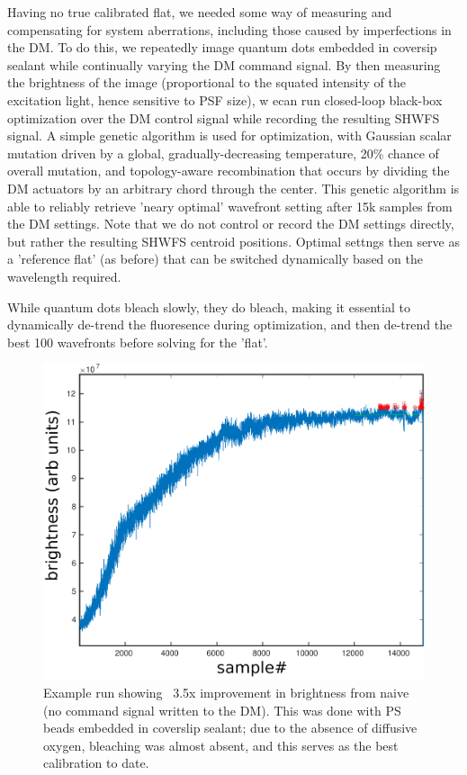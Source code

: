 \documentclass[a4paper,10pt]{article}
\begin{document}
Having no true calibrated flat, we needed some way of measuring and compensating for system aberrations, including those caused by imperfections in the DM.  To do this, we repeatedly image quantum dots embedded in coversip sealant while continually varying the DM command signal.  By then measuring the brightness of the image (proportional to the squated intensity of the excitation light, hence sensitive to PSF size), w ecan run closed-loop black-box optimization over the DM control signal while recording the resulting SHWFS signal.  A simple genetic algorithm is used for optimization, with Gaussian scalar mutation driven by a global, gradually-decreasing temperature, 20\% chance of overall mutation, and topology-aware recombination that occurs by dividing the DM actuators by an arbitrary chord through the center.  This genetic algorithm is able to reliably retrieve 'neary optimal' wavefront setting after 15k samples from the DM settings.  Note that we do not control or record the DM settings directly, but rather the resulting SHWFS centroid positions.  Optimal settngs then serve as a 'reference flat' (as before) that can be switched dynamically based on the wavelength required.  

While quantum dots bleach slowly, they do bleach, making it essential to dynamically de-trend the fluoresence during optimization, and then de-trend the best 100 wavefronts before solving for the 'flat'.

\begin{figure}
\includegraphics[width=\textwidth]{PSbeads_optimization_run.pdf}
\caption{Example run showing ~3.5x improvement in brightness from naive (no command signal written to the DM).  This was done with PS beads embedded in coverslip sealant; due to the absence of diffusive oxygen, bleaching was almost absent, and this serves as the best calibration to date.}
\end{figure}
\end{document}

